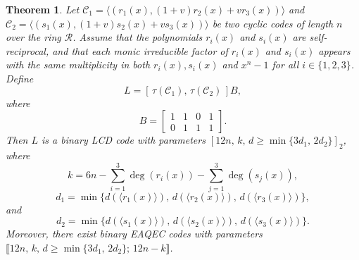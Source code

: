\documentclass[pdflatex,sn-mathphys-num]{sn-jnl}%
\theoremstyle{thmstyleone}%
\newtheorem{theorem}{Theorem}%
\theoremstyle{thmstyletwo}%
\theoremstyle{thmstylethree}%
\begin{document}
\begin{theorem}\label{last_theorem}
Let $\mathcal{C}_{1}=\langle (r_{1}(x),(1+v)r_{2}(x)+vr_{3}(x))\rangle $ and
$\mathcal{C}_{2}=\langle (s_{1}(x),(1+v)s_{2}(x)+vs_{3}(x))\rangle $ be two
cyclic codes of length $n$ over the ring $\mathcal{R}$. Assume that the
polynomials $r_{i}(x)$ and $s_{i}(x)$ are self-reciprocal, and that each
monic irreducible factor of $r_{i}(x)$ and $s_{i}(x)$ appears with the same
multiplicity in both $r_{i}(x),s_{i}(x)$ and $x^{n}-1$ for all $i\in
\{1,2,3\}$. Define
\begin{equation*}
L=[\,\tau (\mathcal{C}_{1}),\,\tau (\mathcal{C}_{2})\,]B,
\end{equation*}
where
\begin{equation*}
B=
\begin{bmatrix}
1 & 1 & 0 & 1 \\
0 & 1 & 1 & 1
\end{bmatrix}
.
\end{equation*}
Then $L$ is a binary LCD code with parameters $[12n,\,k,\,d\geq \min
\{3d_{1},\,2d_{2}\}]_{2}$, where
\begin{equation*}
k=6n-\sum_{i=1}^{3}\deg (r_{i}(x))-\sum_{j=1}^{3}\deg (s_{j}(x)),
\end{equation*}
\begin{equation*}
d_{1}=\min \{d(\langle r_{1}(x)\rangle ),\,d(\langle r_{2}(x)\rangle
),\,d(\langle r_{3}(x)\rangle )\},
\end{equation*}
and
\begin{equation*}
d_{2}=\min \{d(\langle s_{1}(x)\rangle ),\,d(\langle s_{2}(x)\rangle
),\,d(\langle s_{3}(x)\rangle )\}.
\end{equation*}
Moreover, there exist binary EAQEC codes with parameters $\llbracket 12n,\,k,\,d\geq \min \{3d_{1},\,2d_{2}\};\,12n-k\rrbracket$.
\end{theorem}
\end{document}
